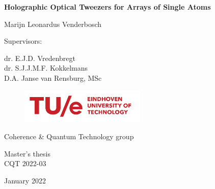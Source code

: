 \begin{titlepage}
	\begin{centering}
		\vspace*{3cm}
		
		\textsf{\LARGE \textbf{Holographic Optical Tweezers for Arrays of Single Atoms}}
		
		\vspace{2.5cm}
		
		\vspace{0.5cm}
		
		\textsf{\Large Marijn Leonardus Venderbosch}
		
		\vspace{2cm}
		
		\textsf{\large Supervisors:}
		
		\vspace{0.5cm}
		
		\textsf{\large dr. E.J.D. Vredenbregt\\
			dr. S.J.J.M.F. Kokkelmans\\
			D.A. Janse van Rensburg, MSc
			}
		
		\vfill
		
		\begin{figure}[h]
			\centering
			\includegraphics[width=6cm]{figures/TUeLogo.png}
		\end{figure}
		
		\textsf{Coherence \& Quantum Technology group}
		
		\vspace{0.4cm}	
		
		\textsf{Master's thesis}\\
		\textsf{CQT 2022-03}
		
		\vspace{0.4cm}	
		
		\textsf{January 2022}
		
		\vspace{1cm}
		
		
	\end{centering}
\end{titlepage}



